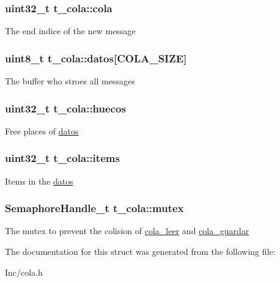 \subsubsection[{\texorpdfstring{cola}{cola}}]{\setlength{\rightskip}{0pt plus 5cm}uint32\+\_\+t t\+\_\+cola\+::cola}\hypertarget{structt__cola_a8b818616f62d19293390150f6c05b0c4}{}\label{structt__cola_a8b818616f62d19293390150f6c05b0c4}
The end indice of the new message 
\subsubsection[{\texorpdfstring{datos}{datos}}]{\setlength{\rightskip}{0pt plus 5cm}uint8\+\_\+t t\+\_\+cola\+::datos\mbox{[}{\bf C\+O\+L\+A\+\_\+\+S\+I\+ZE}\mbox{]}}\hypertarget{structt__cola_a61215b1ae633a2a4463e0abf0a796f41}{}\label{structt__cola_a61215b1ae633a2a4463e0abf0a796f41}
The buffer who stroes all messages 
\subsubsection[{\texorpdfstring{huecos}{huecos}}]{\setlength{\rightskip}{0pt plus 5cm}uint32\+\_\+t t\+\_\+cola\+::huecos}\hypertarget{structt__cola_aacfbba6a49f77a9a6f52a93c95808095}{}\label{structt__cola_aacfbba6a49f77a9a6f52a93c95808095}
Free places of \hyperlink{structt__cola_a61215b1ae633a2a4463e0abf0a796f41}{datos} 
\subsubsection[{\texorpdfstring{items}{items}}]{\setlength{\rightskip}{0pt plus 5cm}uint32\+\_\+t t\+\_\+cola\+::items}\hypertarget{structt__cola_af6a7ddbb78818f9185454bdda842a355}{}\label{structt__cola_af6a7ddbb78818f9185454bdda842a355}
Items in the \hyperlink{structt__cola_a61215b1ae633a2a4463e0abf0a796f41}{datos} 
\subsubsection[{\texorpdfstring{mutex}{mutex}}]{\setlength{\rightskip}{0pt plus 5cm}Semaphore\+Handle\+\_\+t t\+\_\+cola\+::mutex}\hypertarget{structt__cola_a6ab2b175f6265b861c97da1db60eaaf5}{}\label{structt__cola_a6ab2b175f6265b861c97da1db60eaaf5}
The mutex to prevent the colision of \hyperlink{group___cola___exported___functions___group2_ga12fe948f259d8c9d7a390a76c416b55c}{cola\+\_\+leer} and \hyperlink{group___cola___exported___functions___group2_gaa639dba8be8eec5d19259aeb8de2cd7a}{cola\+\_\+guardar} 

The documentation for this struct was generated from the following file\+:\begin{DoxyCompactItemize}
\item 
Inc/cola.\+h\end{DoxyCompactItemize}
